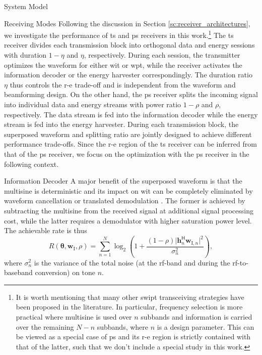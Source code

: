 \begin{section}{System Model}
	\begin{subsection}{Receiving Modes}
		Following the discussion in Section \ref{sc:receiver_architectures}, we investigate the performance of \gls{ts} and \gls{ps} receivers in this work.\footnote{It is worth mentioning that many other \gls{swipt} transceiving strategies have been proposed in the literature. In particular, frequency selection is more practical where multisine is used over $n$ subbands and information is carried over the remaining $N-n$ subbands, where $n$ is a design parameter. This can be viewed as a special case of \gls{ps} and its \gls{r-e} region is strictly contained with that of the latter, such that we don't include a special study in this work.} The \gls{ts} receiver divides each transmission block into orthogonal data and energy sessions with duration $1-\eta$ and $\eta$, respectively. During each session, the transmitter optimizes the waveform for either \gls{wit} or \gls{wpt}, while the receiver activates the information decoder or the energy harvester correspondingly. The duration ratio $\eta$ thus controls the \gls{r-e} trade-off and is independent from the waveform and beamforming design. On the other hand, the \gls{ps} receiver splits the incoming signal into individual data and energy streams with power ratio $1-\rho$ and $\rho$, respectively. The data stream is fed into the information decoder while the energy stream is fed into the energy harvester. During each transmission block, the superposed waveform and splitting ratio are jointly designed to achieve different performance trade-offs.
		Since the \gls{r-e} region of the \gls{ts} receiver can be inferred from that of the \gls{ps} receiver, we focus on the optimization with the \gls{ps} receiver in the following context.
	\end{subsection}


	\begin{subsection}{Information Decoder}
		A major benefit of the superposed waveform is that the multisine is deterministic and its impact on \gls{wit} can be completely eliminated by waveform cancellation or translated demodulation \cite{Clerckx2018b}.
		The former is achieved by subtracting the multisine from the received signal at additional signal processing cost, while the latter requires a demodulator with higher saturation power level.
		The achievable rate is thus
		\begin{equation}\label{eq:R}
			R(\boldsymbol{\theta},\mathbf{w}_{\mathrm{I}},\rho) = \sum_{n=1}^N{\log_2\left(1+\frac{(1-\rho)\lvert \mathbf{h}_{n}^\mathsf{H}\mathbf{w}_{\mathrm{I},n} \rvert^2}{\sigma_n^2}\right)},
		\end{equation}
		where $\sigma_n^2$ is the variance of the total noise (at the \gls{rf}-band and during the \gls{rf}-to-baseband conversion) on tone $n$.
	\end{subsection}



\end{section}
